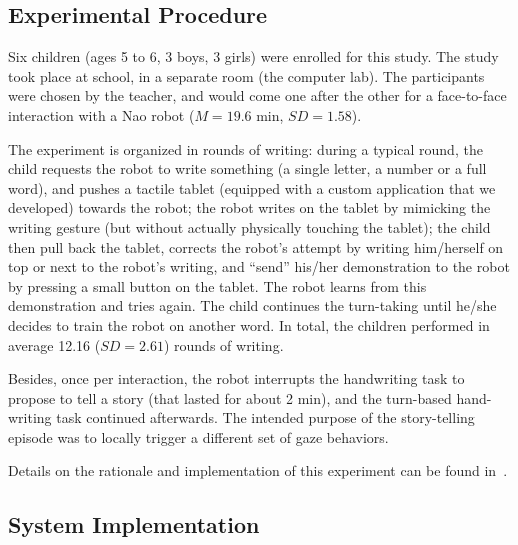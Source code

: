 \documentclass{sig-alternate}
\begin{document}
\subsection{Experimental Procedure}

Six children (ages 5 to 6, 3 boys, 3 girls) were enrolled for this study.
The study took place at school, in a separate room (the computer
lab). The participants were chosen by the teacher, and would come one after the
other for a face-to-face interaction with a {\sc Nao} robot ($M=19.6$ min, $SD=1.58$).

The experiment is organized in rounds of writing: during a typical round, the
child requests the robot to write something (a single letter, a number or a full
word), and pushes a tactile tablet (equipped with a custom application that we
developed) towards the robot; the robot writes on the tablet by mimicking the
writing gesture (but without actually physically touching the tablet); the child
then pull back the tablet, corrects the robot's attempt by writing him/herself
on top or next to the robot's writing, and ``send'' his/her demonstration to the
robot by pressing a small button on the tablet. The robot learns from this
demonstration and tries again. The child continues the turn-taking until he/she
decides to train the robot on another word. In total, the children performed in
average 12.16 ($SD=2.61$) rounds of writing.

Besides, once per interaction, the robot interrupts the handwriting task to
propose to tell a story (that lasted for about 2 min), and the turn-based
hand-writing task continued afterwards. The intended purpose of the
story-telling episode was to locally trigger a different set of gaze behaviors.

Details on the rationale and implementation of this experiment can be found
in~\cite{Hood:2015}.


\subsection{System Implementation}

\label{sec:system}
\end{document}
